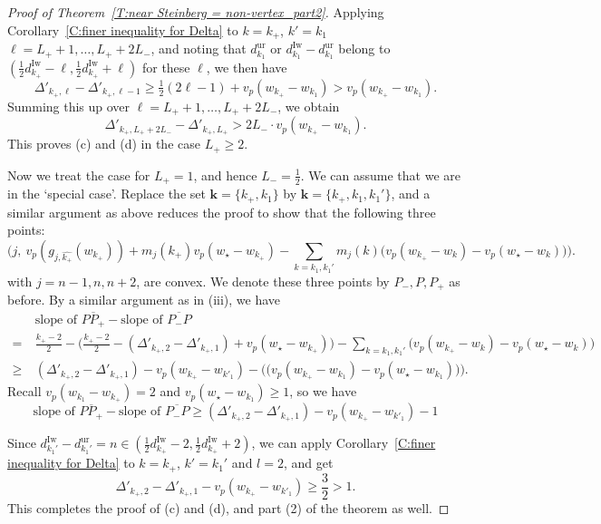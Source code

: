 \documentclass[12pt]{amsart}
\theoremstyle{definition}
\numberwithin{equation}{subsection}
\def\bfk{\mathbf{k}}
\newcommand{\Iw}{\mathrm{Iw}}
\newcommand{\ur}{\mathrm{ur}}
\begin{document}
\begin{proof}[Proof of Theorem~\ref{T:near Steinberg = non-vertex_part2}]
Applying Corollary~\ref{C:finer inequality for Delta} to $k = k_+$, $k'=k_1$ $\ell = L_++1, \dots, L_++2L_-$, and noting that $d_{k_1}^\ur$ or $d_{k_1}^\Iw-d_{k_1}^\ur $ belong to $(\frac 12d_{k_+}^\Iw - \ell, \frac 12d_{k_+}^\Iw+\ell)$ for these $\ell$, we then have
$$
\Delta'_{k_+, \ell} - \Delta'_{k_+, \ell-1} \geq \tfrac 12(2\ell-1) + v_p(w_{k_{+}} - w_{k_1})>v_p(w_{k_{+}} - w_{k_1}).
$$
Summing this up over $\ell = L_++1, \dots, L_++2L_-$, we obtain
$$
\Delta'_{k_+, L_++2L_-} - \Delta'_{k_+, L_+} > 2L_- \cdot v_p(w_{k_{+}} - w_{k_1}).
$$
This proves (c) and (d) in the case $L_+\geq 2$.


Now we treat the case for $L_+=1$, and hence $L_-=\frac 12$. We can assume that we are in the `special case'. Replace the set $\bfk=\{k_+,k_1 \}$ by $\bfk=\{k_+,k_1,k_1' \}$, and a similar argument as above reduces the proof to show that the following three points:
\begin{equation}
\Big( j,\ v_p(g_{j, \hat{ k_+}}(w_{k_+})) + m_j(k_+)v_p(w_\star-w_{k_+}) - \sum _{k=k_1,k_1'}m_j(k)\big(v_p(w_{k_+}-w_{k})- v_p(w_\star-w_{k})  \big)\Big).
\end{equation}
with $j=n-1,n,n+2$, are convex. We denote these three points by $P_-,P,P_+$ as before. By a similar argument as in (iii), we have 
\begin{align*}
&\textrm{slope of }\overline{PP_+}  - \textrm{slope of }\overline{P_-P}
\\
=\ & \frac{k_+-2}2 - \Big( \frac{k_+-2}2  -(\Delta'_{k_+, 2} - \Delta'_{k_+, 1}) +v_p(w_\star-w_{k_+})\Big) -
\sum_{k=k_1,k_1'} \big(v_p(w_{k_+}-w_{k})- v_p(w_\star-w_{k})  \big)
\\
\geq \ &(\Delta'_{k_+, 2} - \Delta'_{k_+, 1})- v_p(w_{k_+}-w_{k'_1})-\Big(\big(v_p(w_{k_+}-w_{k_1})- v_p(w_\star-w_{k_1})  \big)\Big).
\end{align*}
Recall $v_p(w_{k_1}-w_{k_+})=2$ and $v_p(w_\star-w_{k_1})\geq 1$, so we have 
\[
\textrm{slope of }\overline{PP_+}  - \textrm{slope of }\overline{P_-P}\geq (\Delta'_{k_+, 2} - \Delta'_{k_+, 1}) - v_p(w_{k_+}-w_{k'_1})-1
\]

Since $d_{k_1'}^\Iw-d_{k_1'}^\ur=n\in (\frac 12 d_{k_+}^\Iw-2,\frac 12 d_{k_+}^\Iw+2)$, we can apply Corollary~\ref{C:finer inequality for Delta} to $k=k_+$, $k'=k_1'$ and $l=2$, and get 
\[
\Delta'_{k_+, 2} - \Delta'_{k_+, 1}- v_p(w_{k_+}-w_{k'_1})\geq \frac 32>1.
\]
This completes the proof of (c) and (d), and part (2) of the theorem as well.




\end{proof}
\end{document}
